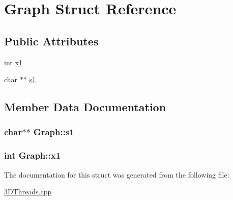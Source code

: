 \hypertarget{structGraph}{\section{Graph Struct Reference}
\label{structGraph}
}
\subsection*{Public Attributes}
\begin{DoxyCompactItemize}
\item 
int \hyperlink{structGraph_a9dd4ae568a6d821eb75f2ed958475090}{x1}
\item 
char $\ast$$\ast$ \hyperlink{structGraph_a7e796504e921c0d9cb144c589f3f48bb}{s1}
\end{DoxyCompactItemize}


\subsection{Member Data Documentation}
\hypertarget{structGraph_a7e796504e921c0d9cb144c589f3f48bb}{
\subsubsection[{s1}]{\setlength{\rightskip}{0pt plus 5cm}char$\ast$$\ast$ Graph\+::s1}}\label{structGraph_a7e796504e921c0d9cb144c589f3f48bb}
\hypertarget{structGraph_a9dd4ae568a6d821eb75f2ed958475090}{
\subsubsection[{x1}]{\setlength{\rightskip}{0pt plus 5cm}int Graph\+::x1}}\label{structGraph_a9dd4ae568a6d821eb75f2ed958475090}


The documentation for this struct was generated from the following file\+:\begin{DoxyCompactItemize}
\item 
\hyperlink{3DThreads_8cpp}{3\+D\+Threads.\+cpp}\end{DoxyCompactItemize}
